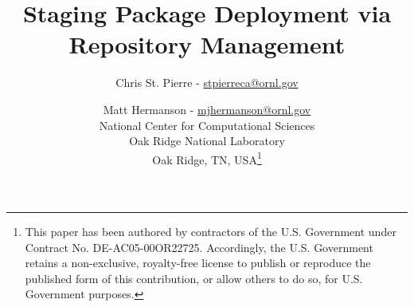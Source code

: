 \documentclass[letterpaper,10pt]{article}
\title{\Large \bf Staging Package Deployment via Repository Management}
\author{Chris St. Pierre - \url{stpierreca@ornl.gov}\\
\and
Matt Hermanson - \url{mjhermanson@ornl.gov}\\
National Center for Computational Sciences\\
Oak Ridge National Laboratory\\
Oak Ridge, TN, USA\thanks{This paper has been authored by contractors
  of the U.S. Government under Contract
  No. DE-AC05-00OR22725. Accordingly, the U.S. Government retains a
  non-exclusive, royalty-free license to publish or reproduce the
  published form of this contribution, or allow others to do so, for
  U.S. Government purposes.}}
\begin{document}
\date{}

\maketitle
\begin{abstract}
  
\end{abstract}

\begin{multicols}{2}





{\footnotesize 
}

\theendnotes
\end{multicols}
\end{document}

